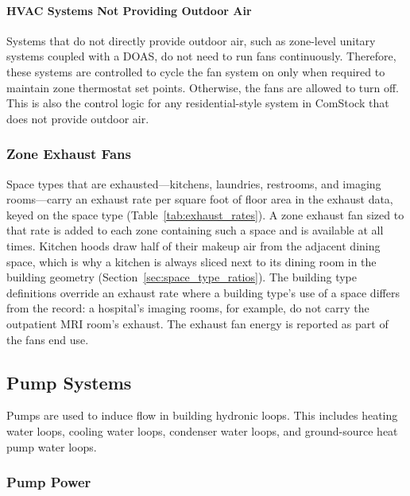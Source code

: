 \paragraph{HVAC Systems Not Providing Outdoor Air}

Systems that do not directly provide outdoor air, such as zone-level unitary systems coupled with a DOAS, do not need to run fans continuously. Therefore, these systems are controlled to cycle the fan system on only when required to maintain zone thermostat set points. Otherwise, the fans are allowed to turn off. This is also the control logic for any residential-style system in ComStock that does not provide outdoor air.

\subsubsection{Zone Exhaust Fans}

Space types that are exhausted---kitchens, laundries, restrooms, and imaging rooms---carry an exhaust rate per square foot of floor area in the exhaust data, keyed on the space type (Table~\ref{tab:exhaust_rates}). A zone exhaust fan sized to that rate is added to each zone containing such a space and is available at all times. Kitchen hoods draw half of their makeup air from the adjacent dining space, which is why a kitchen is always sliced next to its dining room in the building geometry (Section~\ref{sec:space_type_ratios}). The building type definitions override an exhaust rate where a building type's use of a space differs from the record: a hospital's imaging rooms, for example, do not carry the outpatient MRI room's exhaust. The exhaust fan energy is reported as part of the fans end use.



\subsection{Pump Systems}

Pumps are used to induce flow in building hydronic loops. This includes heating water loops, cooling water loops, condenser water loops, and ground-source heat pump water loops.

\subsubsection{Pump Power}

